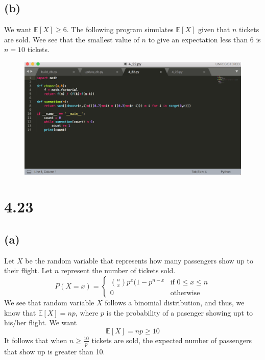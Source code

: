 \documentclass[11pt]{article}
\begin{document}
\subsection*{(b)}
We want $\mathbb{E}[X]\geq 6$. The following program simulates $\mathbb{E}[X]$ given that $n$ tickets are sold. Wee see that the smallest value of $n$ to give an expectation less than 6 is $n=10$ tickets.
\begin{figure}[h!]
	\centering
	\includegraphics[width=\textwidth]{4_22.png}
\end{figure}

\section*{4.23}
\subsection*{(a)}
Let $X$ be the random variable that represents how many passengers show up to their flight. Let $n$ represent the number of tickets sold.
\[P(X=x)=\begin{cases}
	\binom{n}{x}p^x(1-p^{n-x} & \text{if }0\leq x\leq n \\
	0 & \text{otherwise}
\end{cases}\]
We see that random variable $X$ follows a binomial distribution, and thus, we know that $\mathbb{E}[X]=np$, where $p$ is the probability of a pasenger showing upt to his/her flight. We want
\[\mathbb{E}[X]=np\geq10\]
It follows that when $n\geq\frac{10}{p}$ tickets are sold, the expected number of passengers that show up is greater than 10.
\end{document}
